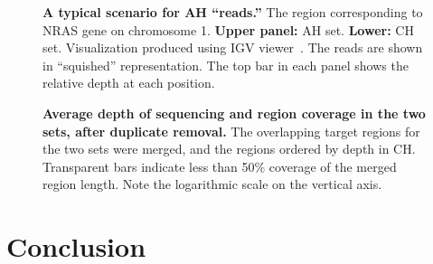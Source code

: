 \documentclass[fleqn]{scrartcl}%
\begin{document}
%
\begin{figure}[ht]%
	\caption {\textbf{A typical scenario for AH ``reads.''}
	The region corresponding to NRAS gene on chromosome 1. \textbf{Upper panel:} AH set. \textbf{Lower:} CH set.
	Visualization produced using IGV viewer~\cite{robinson2011integrative}.
	The reads are shown in ``squished'' representation.  The top bar in each panel shows the relative depth at each position.}
	\label{fig:igv}
\end{figure}
%

%
\begin{figure}[ht]%
	\caption {\textbf{Average depth of sequencing and region coverage in the two sets, after duplicate removal.}
	The overlapping target regions for the two sets were merged, and the regions ordered by depth in CH.
	Transparent bars indicate less than 50\% coverage of the merged region length.
	Note the logarithmic scale on the vertical axis. }
	\label{fig:depth}
\end{figure}
%


\section{Conclusion}



%
\clearpage


\end{document}
